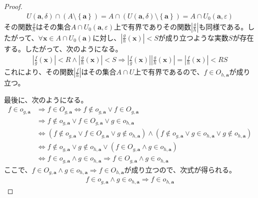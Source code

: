 \documentclass[dvipdfmx]{jsarticle}
\begin{document}
\begin{proof}
\begin{align*}
U\left( \mathbf{a},\delta \right) \cap \left( A \setminus \left\{ \mathbf{a} \right\} \right) = A \cap \left( U\left( \mathbf{a},\delta \right) \setminus \left\{ \mathbf{a} \right\} \right) = A \cap U_{0}\left( \mathbf{a},\varepsilon \right)
\end{align*}
その関数$\frac{g}{h}$はその集合$A \cap U_{0}\left( \mathbf{a},\varepsilon \right)$上で有界でありその関数$\left| \frac{g}{h} \right|$も同様である。したがって、$\forall\mathbf{x} \in A \cap U_{0}\left( \mathbf{a} \right)$に対し、$\left| \frac{g}{h}\left( \mathbf{x} \right) \right| < S$が成り立つような実数$S$が存在する。したがって、次のようになる。
\begin{align*}
\left| \frac{f}{g}\left( \mathbf{x} \right) \right| < R \land \left| \frac{g}{h}\left( \mathbf{x} \right) \right| < S \Rightarrow \left| \frac{f}{g}\left( \mathbf{x} \right) \right|\left| \frac{g}{h}\left( \mathbf{x} \right) \right| = \left| \frac{f}{h}\left( \mathbf{x} \right) \right| < RS
\end{align*}
これにより、その関数$\left| \frac{f}{h} \right|$はその集合$A \cap U$上で有界であるので、$f \in O_{h,\mathbf{a}}$が成り立つ。\par
最後に、次のようになる。
\begin{align*}
f \in o_{g,\mathbf{a}} &\Rightarrow f \in O_{g,\mathbf{a}} \Leftrightarrow f \notin o_{g,\mathbf{a}} \vee f \in O_{g,\mathbf{a}}\\
&\Rightarrow f \notin o_{g,\mathbf{a}} \vee f \in O_{g,\mathbf{a}} \vee g \in o_{h,\mathbf{a}}\\
&\Leftrightarrow \left( f \notin o_{g,\mathbf{a}} \vee f \in O_{g,\mathbf{a}} \vee g \notin o_{h,\mathbf{a}} \right) \land \left( f \notin o_{g,\mathbf{a}} \vee g \in o_{h,\mathbf{a}} \vee g \notin o_{h,\mathbf{a}} \right)\\
&\Leftrightarrow f \notin o_{g,\mathbf{a}} \vee g \notin o_{h,\mathbf{a}} \vee \left( f \in O_{g,\mathbf{a}} \land g \in o_{h,\mathbf{a}} \right)\\
&\Leftrightarrow f \in o_{g,\mathbf{a}} \land g \in o_{h,\mathbf{a}} \Rightarrow f \in O_{g,\mathbf{a}} \land g \in o_{h,\mathbf{a}}
\end{align*}
ここで、$f \in O_{g,\mathbf{a}} \land g \in o_{h,\mathbf{a}} \Rightarrow f \in O_{h,\mathbf{a}}$が成り立つので、次式が得られる。
\begin{align*}
f \in o_{g,\mathbf{a}} \land g \in o_{h,\mathbf{a}} \Rightarrow f \in o_{h,\mathbf{a}}
\end{align*}
\end{proof}
\end{document}
